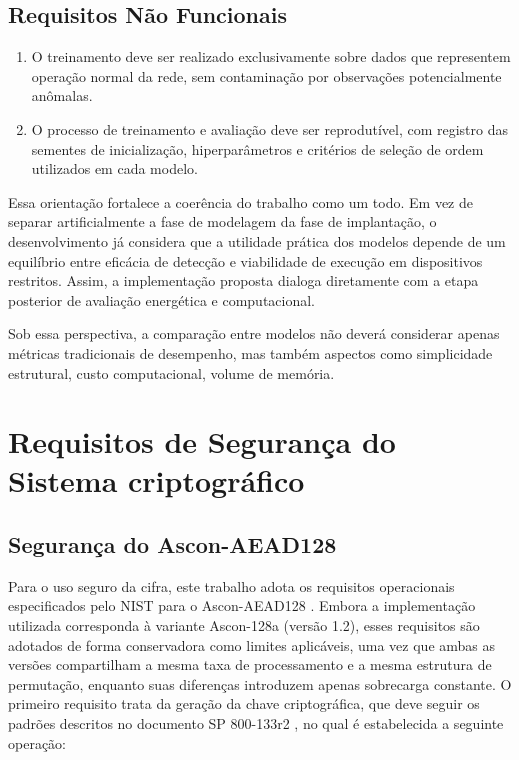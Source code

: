\subsection{Requisitos Não Funcionais}

\begin{enumerate}

    \item[RNF1.] O treinamento deve ser realizado exclusivamente sobre dados que 
    representem operação normal da rede, sem contaminação por observações 
    potencialmente anômalas.

    \item[RNF2.] O processo de treinamento e avaliação deve ser reprodutível, com 
    registro das sementes de inicialização, hiperparâmetros e critérios de 
    seleção de ordem utilizados em cada modelo.

\end{enumerate}

Essa orientação fortalece a coerência do trabalho como um todo. Em vez de separar artificialmente a fase de modelagem da fase de implantação, o desenvolvimento já considera que a utilidade prática dos modelos depende de um equilíbrio entre eficácia de detecção e viabilidade de execução em dispositivos restritos. Assim, a implementação proposta dialoga diretamente com a etapa posterior de avaliação energética e computacional.

Sob essa perspectiva, a comparação entre modelos não deverá considerar apenas métricas tradicionais de desempenho, mas também aspectos como simplicidade estrutural, custo computacional, volume de memória.


\section{Requisitos de Segurança do Sistema criptográfico}
\subsection{Segurança do Ascon-AEAD128}
Para o uso seguro da cifra, este trabalho adota os requisitos operacionais especificados pelo NIST para o Ascon-AEAD128 \cite{nist800232}. Embora a implementação utilizada corresponda à variante Ascon-128a (versão 1.2), esses requisitos são adotados de forma conservadora como limites aplicáveis, uma vez que ambas as versões compartilham a mesma taxa de processamento e a mesma estrutura de permutação, enquanto suas diferenças introduzem apenas sobrecarga constante. O primeiro requisito trata da geração da chave criptográfica, que deve seguir os padrões descritos no documento SP 800-133r2 , no qual é estabelecida a seguinte operação:

